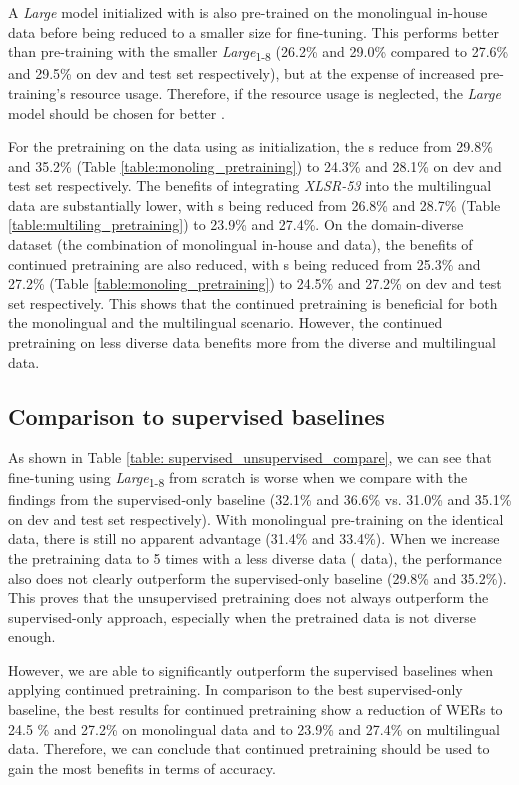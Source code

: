 A \textit{Large} model initialized with  is also pre-trained on the monolingual in-house data before being reduced to a smaller size for fine-tuning.
This performs better than pre-training with the smaller \textit{Large}\textsubscript{1-8} (26.2\% and 29.0\% compared to 27.6\% and 29.5\% on dev and test set respectively), but at the expense of increased pre-training's resource usage.
Therefore, if the resource usage is neglected, the \textit{Large} model should be chosen for better .

For the pretraining on the  data using  as initialization, the s reduce from 29.8\% and 35.2\% (Table \ref{table:monoling_pretraining}) to 24.3\% and 28.1\% on dev and test set respectively. 
The benefits of integrating \textit{XLSR-53} into the multilingual data are substantially lower, with s being reduced from 26.8\% and 28.7\% (Table \ref{table:multiling_pretraining}) to 23.9\% and 27.4\%.
On the domain-diverse dataset (the combination of monolingual in-house and  data), the benefits of continued pretraining are also reduced, with s being reduced from 25.3\% and 27.2\% (Table \ref{table:monoling_pretraining}) to 24.5\% and 27.2\% on dev and test set respectively.
This shows that the continued pretraining is beneficial for both the monolingual and the multilingual scenario. However, the continued pretraining on less diverse data benefits more from the diverse and multilingual data.

\subsection{Comparison to supervised baselines}



As shown in Table \ref{table: supervised_unsupervised_compare}, we can see that fine-tuning using  \textit{Large}\textsubscript{1-8}\xspace from scratch is worse when we compare with the findings from the supervised-only baseline (32.1\% and 36.6\% vs. 31.0\% and 35.1\% on dev and test set respectively).
With monolingual pre-training on the identical data, there is still no apparent advantage (31.4\% and 33.4\%).
When we increase the pretraining data to 5 times with a less diverse data ( data), the performance also does not clearly outperform the supervised-only baseline (29.8\% and 35.2\%).
This proves that the  unsupervised pretraining does not always outperform the  supervised-only approach, especially when the pretrained data is not diverse enough.

However, we are able to significantly outperform the supervised baselines when applying continued pretraining.
In comparison to the best supervised-only baseline, the best results for continued pretraining show a reduction of \glspl{WER} to 24.5 \% and 27.2\% on monolingual data and to 23.9\% and 27.4\% on multilingual data.
Therefore, we can conclude that continued pretraining should be used to gain the most benefits in terms of accuracy.